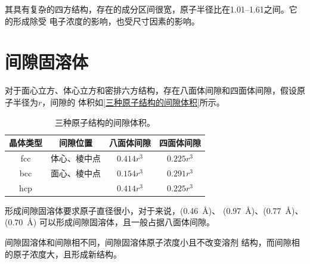             其具有复杂的四方结构，存在的成分区间很宽，原子半径比在\numrange{1.01}{1.61}之间。它的形成除受
            电子浓度的影响，也受尺寸因素的影响。
    \section{间隙固溶体}
        对于面心立方、体心立方和密排六方结构，存在八面体间隙和四面体间隙，假设原子半径为$r$，间隙的
        体积如\autoref{三种原子结构的间隙体积}所示。
        \begin{table}[ht]
            \centering
            \caption{三种原子结构的间隙体积。}
            \label{三种原子结构的间隙体积}
            \begin{tabular}{cccc}
                \toprule
                晶体类型&间隙位置&八面体间隙&四面体间隙\\
                \midrule
                fcc&体心、棱中点&$0.414r^3$&$0.225r^3$\\
                bcc&面心、棱中点&$0.154r^3$&$0.291r^3$\\
                hcp&&$0.414r^3$&$0.225r^3$\\
                \bottomrule
            \end{tabular}
        \end{table}
        
        形成间隙固溶体要求原子直径很小，对于来说，(\SI{0.46}{\angstrom})、
        (\SI{0.97}{\angstrom})、(\SI{0.77}{\angstrom})、(\SI{0.70}{\angstrom})
        可以形成间隙固溶体，且一般占据八面体间隙。

        间隙固溶体和间隙相不同，间隙固溶体原子浓度小且不改变溶剂
        结构，而间隙相的原子浓度大，且形成新结构。